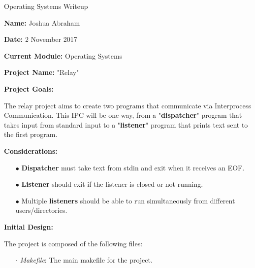 \documentclass{article}
\begin{document}
\centerline{\sc \large Operating Systems Writeup}
\vspace{.5pc}

\begin{flushleft}
\textbf{Name:} Joshua Abraham
\vspace{.5pc}

\textbf{Date:} 2 November 2017
\vspace{.5pc}

\textbf{Current Module:} Operating Systems
\vspace{.5pc}

\textbf{Project Name:} "Relay"
\vspace{.5pc}

\textbf{Project Goals:}
\vspace{.5pc}
\end{flushleft}

The relay project aims to create two programs that communicate via Interprocess 
Communication.  This IPC will be one-way, from a "\textbf{dispatcher}" program 
that takes input from standard input to a "\textbf {listener}" program that 
prints text sent to the first program.
\vspace{.5pc}

\begin{flushleft}
\textbf{Considerations:}
\vspace{.5pc}
\end{flushleft}

\begin{itemize}
	\item[$\bullet$] \textbf{Dispatcher} must take text from stdin and exit when
	it receives an EOF.
	\item[$\bullet$] \textbf{Listener} should exit if the listener is closed or
	not running.
	\item[$\bullet$] Multiple \textbf{listeners} should be able to run 
	simultaneously from different users/directories.
\end{itemize}
\vspace{.5pc}

\begin{flushleft}
\textbf{Initial Design:}
\vspace{.5pc}
\end{flushleft}

The project is composed of the following files:
\begin{itemize}
	\item [$\cdot$] \textit{Makefile}: The main makefile for the project.
\end{itemize}
\vspace{2mm}
\end{document}
